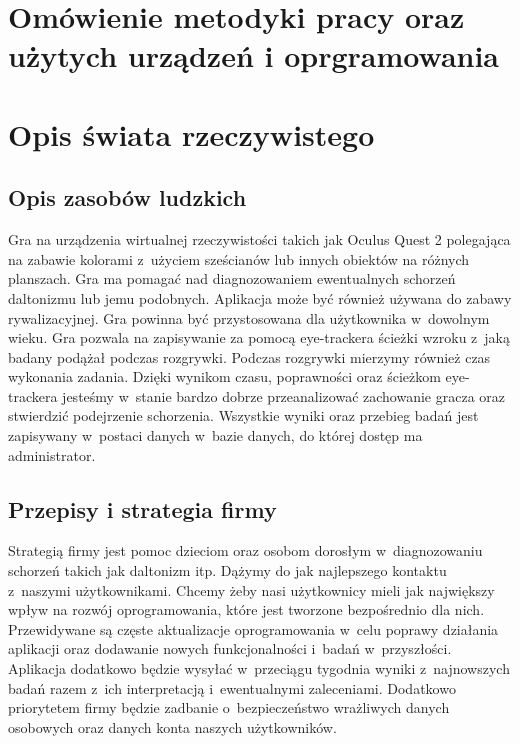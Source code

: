 \documentclass[12pt, letterpaper]{article}
\begin{document}
\section{Omówienie metodyki pracy oraz użytych urządzeń i oprgramowania}

\newpage


\section{Opis świata rzeczywistego}

	\subsection{Opis zasobów ludzkich}

	Gra na urządzenia wirtualnej rzeczywistości takich jak Oculus Quest 2 polegająca na zabawie kolorami z~użyciem sześcianów lub innych obiektów na różnych planszach. Gra ma pomagać nad diagnozowaniem ewentualnych schorzeń daltonizmu lub jemu podobnych. Aplikacja może być również używana do zabawy rywalizacyjnej. Gra powinna być przystosowana dla użytkownika w~dowolnym wieku. Gra pozwala na zapisywanie za pomocą eye-trackera ścieżki wzroku z~jaką badany podążał podczas rozgrywki. Podczas rozgrywki mierzymy również czas wykonania zadania. Dzięki wynikom czasu, poprawności oraz ścieżkom eye-trackera jesteśmy w~stanie bardzo dobrze przeanalizować zachowanie gracza oraz stwierdzić podejrzenie schorzenia. Wszystkie wyniki oraz przebieg badań jest zapisywany w~postaci danych w~bazie danych, do której dostęp ma administrator.
	

	\subsection{Przepisy i strategia firmy}
	
	Strategią firmy jest pomoc dzieciom oraz osobom dorosłym w~diagnozowaniu schorzeń takich jak daltonizm itp. Dążymy do jak najlepszego kontaktu z~naszymi użytkownikami. Chcemy żeby nasi użytkownicy mieli jak największy wpływ na rozwój oprogramowania, które jest tworzone bezpośrednio dla nich. Przewidywane są częste aktualizacje oprogramowania w~celu poprawy działania aplikacji oraz dodawanie nowych funkcjonalności i~badań w~przyszłości. Aplikacja dodatkowo będzie wysyłać w~przeciągu tygodnia wyniki z~najnowszych badań razem z~ich interpretacją i~ewentualnymi zaleceniami. Dodatkowo priorytetem firmy będzie zadbanie o~bezpieczeństwo wrażliwych danych osobowych oraz danych konta naszych użytkowników.
	
\end{document}
